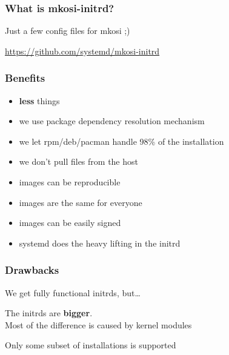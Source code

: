 \documentclass[]{beamer}
\newcommand\pp\pause
\begin{document}
\begin{frame}
  \frametitle{What is mkosi-initrd?}
  \pp
  Just a few config files for mkosi ;)

  \vfill

  \url{https://github.com/systemd/mkosi-initrd}\vspace{-5em}
\end{frame}

\begin{frame}
  \frametitle{Benefits}

  \begin{itemize}
  \item \textbf{less} things
    \pp
  \item we use package dependency resolution mechanism
    \pp
  \item we let rpm/deb/pacman handle 98\% of the installation
    \pp
  \item we don't pull files from the host
    \pp
  \item images can be reproducible
    \pp
  \item images are the same for everyone
    \pp
  \item images can be easily signed
    \pp
  \item systemd does the heavy lifting in the initrd
  \end{itemize}
\end{frame}

\begin{frame}
  \frametitle{Drawbacks}

  We get fully functional initrds, but…
  \\\quad
  \pp

  The initrds are \textbf{bigger}.\\
  \pp
  Most of the difference is caused by kernel modules
  \\\quad

  \pp
  Only some subset of installations is supported
\end{frame}
\end{document}
